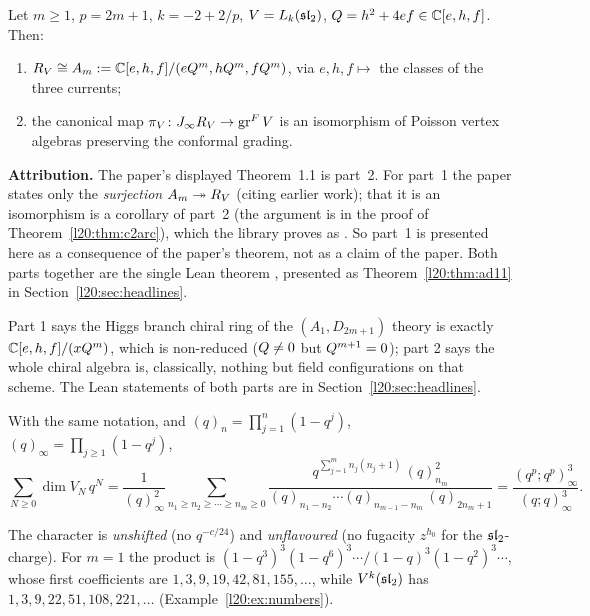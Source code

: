 \begin{theorem}\label{l20:thm:paper11}
Let $m\ge1$, $p=2m+1$, $k=-2+2/p$, $V=L_k(\mathfrak{sl}_2)$, $Q=h^2+4ef\in{\mathbb{C}}[e,h,f]$. Then:
\begin{enumerate}
\item $R_V\cong A_m:={\mathbb{C}}[e,h,f]/(eQ^m,hQ^m,fQ^m)$, via $e,h,f\mapsto$ the
  classes of the three currents;
\item the canonical map $\pi_V\colon J_\infty R_V\to\operatorname{gr}^F V$ is an isomorphism of Poisson vertex
  algebras preserving the conformal grading.
\end{enumerate}
\end{theorem}
\noindent\textbf{Attribution.} The paper's displayed Theorem~1.1 is part~2. For part~1 the paper states only the
\emph{surjection} $A_m\twoheadrightarrow R_V$ (citing earlier work); that it is an isomorphism is a corollary of
part~2 (the argument is in the proof of Theorem~\ref{l20:thm:c2arc}), which the library proves as
. So part~1 is presented here as a consequence of the paper's theorem, not as a claim of the paper.
Both parts together are the single Lean theorem , presented as Theorem~\ref{l20:thm:ad11}
in Section~\ref{l20:sec:headlines}.

\begin{physics}
Part 1 says the Higgs branch chiral ring of the $(A_1,D_{2m+1})$ theory is exactly
${\mathbb{C}}[e,h,f]/(xQ^m)$, which is non-reduced ($Q\neq0$ but $Q^{m+1}=0$); part 2 says the whole chiral algebra is, classically, nothing but
field configurations on that scheme. The Lean statements of both parts are in Section~\ref{l20:sec:headlines}.
\end{physics}

\begin{theorem}\label{l20:thm:paper12}
With the same notation, and $(q)_n=\prod_{j=1}^n(1-q^j)$, $(q)_\infty=\prod_{j\ge1}(1-q^j)$,
\begin{equation}\label{l20:eq:fermionic}
\sum_{N\ge0}\dim V_N\,q^N=\frac{1}{(q)_\infty^2}\sum_{n_1\ge n_2\ge\cdots\ge n_m\ge0}
\frac{q^{\sum_{j=1}^mn_j(n_j+1)}\,(q)_{n_m}^2}{(q)_{n_1-n_2}\cdots(q)_{n_{m-1}-n_m}\,(q)_{2n_m+1}}
=\frac{(q^p;q^p)_\infty^3}{(q;q)_\infty^3}.
\end{equation}
\end{theorem}

The character is \emph{unshifted} (no $q^{-c/24}$) and \emph{unflavoured} (no fugacity $z^{h_0}$ for the
$\mathfrak{sl}_2$-charge). For $m=1$ the product is $(1-q^3)^3(1-q^6)^3\cdots/(1-q)^3(1-q^2)^3\cdots$, whose
first coefficients are $1,3,9,19,42,81,155,\dots$, while $V^k(\mathfrak{sl}_2)$ has $1,3,9,22,51,108,221,\dots$
(Example~\ref{l20:ex:numbers}).

